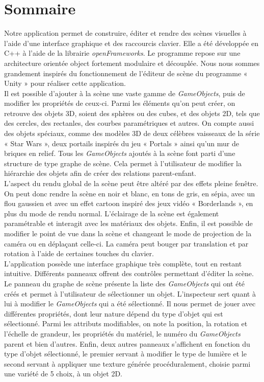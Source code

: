 \section{Sommaire}
\label{s:sommaire}

Notre application permet de construire, éditer et rendre des scènes visuelles à l'aide d'une interface graphique et des raccourcis clavier.
Elle a été développée en C++ à l'aide de la librairie \emph{openFrameworks}.
Le programme repose sur une architecture orientée object fortement modulaire et découplée.
Nous nous sommes grandement inspirés du fonctionnement de l'éditeur de scène du programme « Unity » pour réaliser cette application.\\

Il est possible d'ajouter à la scène une vaste gamme de \emph{GameObjects}, puis de modifier les propriétés de ceux-ci.
Parmi les éléments qu'on peut créer, on retrouve des objets 3D, soient des sphères ou des cubes, et des objets 2D, tels que des cercles, des rectanles, des courbes paramétriques et autres.
On compte aussi des objets spéciaux, comme des modèles 3D de deux célèbres vaisseaux de la série « Star Wars », deux portails inspirés du jeu « Portals » ainsi qu'un mur de briques en relief. Tous les \emph{GameObjects} ajoutés à la scène font parti d'une structure de type graphe de scène. Cela permet à l'utilisateur de modifier la hiérarchie des objets afin de créer des relations parent-enfant.\\

L'aspect du rendu global de la scène peut être altéré par des effets pleine fenêtre.
On peut donc rendre la scène en noir et blanc, en tons de gris, en sépia, avec un flou gaussien et avec un effet cartoon inspiré des jeux vidéo « Borderlands », en plus du mode de rendu normal.
L'éclairage de la scène est également paramétrable et interagit avec les matériaux des objets.
Enfin, il est possible de modifier le point de vue dans la scène et changeant le mode de projection de la caméra ou en déplaçant celle-ci.
La caméra peut bouger par translation et par rotation à l’aide de certaines touches du clavier.\\

L'application possède une interface graphique très complète, tout en restant intuitive.
Différents panneaux offrent des contrôles permettant d'éditer la scène.
Le panneau du graphe de scène présente la liste des \emph{GameObjects} qui ont été créés et permet à l'utilisateur de sélectionner un objet.
L'inspecteur sert quant à lui à modifier le \emph{GameObjects} qui a été sélectionné.
Il nous permet de jouer avec différentes propriétés, dont leur nature dépend du type d'objet qui est sélectionné.
Parmi les attributs modifiables, on note la position, la rotation et l’échelle de grandeur, les propriétés du matériel, le numéro du \emph{GameObjects} parent et bien d'autres.
Enfin, deux autres panneaux s'affichent en fonction du type d'objet sélectionné, le premier servant à modifier le type de lumière et le second servant à appliquer une texture générée procéduralement, choisie parmi une variété de 5 choix, à un objet 2D.\\

